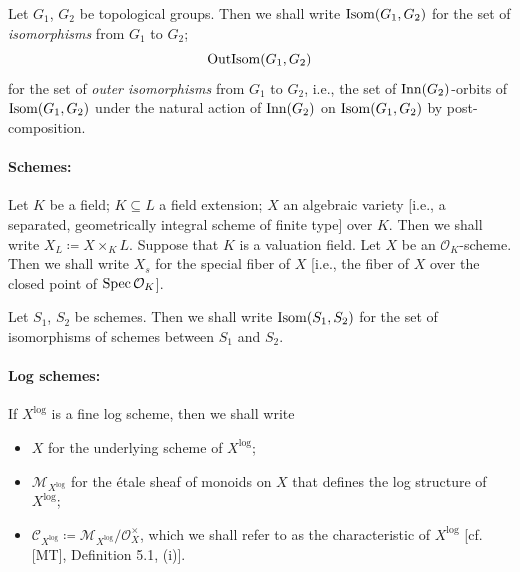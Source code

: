 Let $G_1$, $G_2$ be topological groups. Then we shall write $\mathrm{Isom}(G_1, G_2)$ for the set of \emph{isomorphisms} from $G_1$ to $G_2$; \[\mathrm{OutIsom}(G_1, G_2)\] for the set of \emph{outer isomorphisms} from $G_1$ to $G_2$, i.e., the set of $\mathrm{Inn}(G_2)$-orbits of $\mathrm{Isom}(G_1, G_2)$ under the natural action of $\mathrm{Inn}(G_2)$ on $\mathrm{Isom}(G_1, G_2)$ by post-composition.

\paragraph*{Schemes:}

Let $K$ be a field; $K \subseteq L$ a field extension; $X$ an algebraic variety [i.e., a separated, geometrically integral scheme of finite type] over $K$. Then we shall write $X_L \coloneqq X \times_K L$. Suppose that $K$ is a valuation field. Let $X$ be an $\mathcal{O}_K$-scheme. Then we shall write $X_s$ for the special fiber of $X$ [i.e., the fiber of $X$ over the closed point of $\mathrm{Spec} \, \mathcal{O}_K$].

Let $S_1$, $S_2$ be schemes. Then we shall write $\mathrm{Isom}(S_1, S_2)$ for the set of isomorphisms of schemes between $S_1$ and $S_2$.

\paragraph*{Log schemes:}

If $X^\log$ is a fine log scheme, then we shall write

\begin{itemize}
\item $X$ for the underlying scheme of $X^\log$;
\item $\mathcal{M}_{X^\log}$ for the \'{e}tale sheaf of monoids on $X$ that defines the log structure of
$X^\log$;
\item $\mathcal{C}_{X^\log} \coloneqq \mathcal{M}_{X^\log} / \mathcal{O}_X^\times$, which we shall refer to as the characteristic of $X^\log$ [cf. [MT], Definition 5.1, (i)].
\end{itemize}

